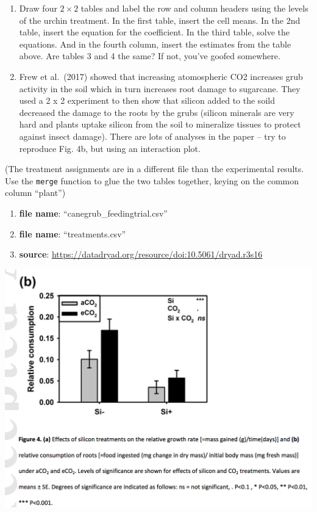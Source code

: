 \documentclass[]{book}
\providecommand{\tightlist}{%
  \setlength{\itemsep}{0pt}\setlength{\parskip}{0pt}}
\begin{document}
\begin{enumerate}
\def\labelenumi{\arabic{enumi}.}
\item
  Draw four \(2 \times 2\) tables and label the row and column headers using the levels of the urchin treatment. In the first table, insert the cell means. In the 2nd table, insert the equation for the coefficient. In the third table, solve the equations. And in the fourth column, insert the estimates from the table above. Are tables 3 and 4 the same? If not, you've goofed somewhere.
\item
  Frew et al.~(2017) showed that increasing atomospheric CO2 increases grub activity in the soil which in turn increases root damage to sugarcane. They used a 2 x 2 experiment to then show that silicon added to the soild decreased the damage to the roots by the grubs (silicon minerals are very hard and plants uptake silicon from the soil to mineralize tissues to protect against insect damage). There are lots of analyses in the paper -- try to reproduce Fig. 4b, but using an interaction plot.
\end{enumerate}

(The treatment assignments are in a different file than the experimental results. Use the \texttt{merge} function to glue the two tables together, keying on the common column ``plant'')

\begin{enumerate}
\def\labelenumi{\arabic{enumi}.}
\tightlist
\item
  \textbf{file name}: ``canegrub\_feedingtrial.csv''
\item
  \textbf{file name}: ``treatments.csv''
\item
  \textbf{source}: \url{https://datadryad.org/resource/doi:10.5061/dryad.r3s16}
\end{enumerate}

\includegraphics{images/frew_fig_4b.png}
\end{document}

